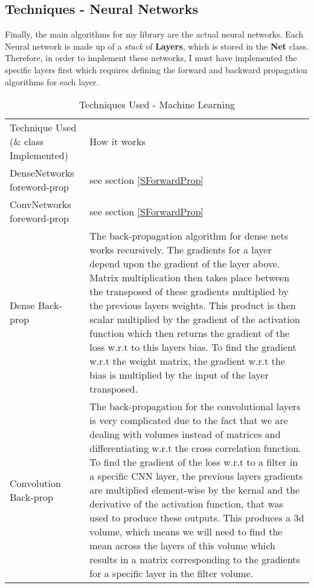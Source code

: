\subsection{Techniques - Neural Networks}
Finally, the main algorithms for my library are the actual neural networks. Each Neural network is made up of a \textit{stack} of \textbf{Layers}, which is stored in the \textbf{Net} class. Therefore, in order to implement these networks, I must have implemented the specific layers first which requires defining the forward and backward propagation algorithms for each layer.

\begin{table}[H]
\centering
    \begin{tabular}{|p{4cm}|p{11cm}|}
    \hline
    Technique Used (\& class Implemented) & How it works \\ \cline{1-2}
    
    DenseNetworks foreword-prop & see section \ref{SForwardProp} \\ \cline{1-2}
    
    ConvNetworks foreword-prop & see section \ref{SForwardProp} \\ \cline{1-2}
    
    Dense Back-prop & The back-propagation algorithm for dense nets works recursively. The gradients for a layer depend upon the gradient of the layer above. Matrix multiplication then takes place between the transposed of these gradients multiplied by the previous layers weights. This product is then scalar multiplied by the gradient of the activation function which then returns the gradient of the loss w.r.t to this layers bias. To find the gradient w.r.t the weight matrix, the gradient w.r.t the bias is multiplied by the input of the layer transposed.  \\ \cline{1-2}
    
    Convolution Back-prop & The back-propagation for the convolutional layers is very complicated due to the fact that we are dealing with volumes instead of matrices and differentiating w.r.t the cross correlation function. To find the gradient of the loss w.r.t to a filter in a specific CNN layer, the previous layers gradients are multiplied element-wise by the kernal and the derivative of the activation function, that was used to produce these outputs. This produces a 3d volume, which means we will need to find the mean across the layers of this volume which results in a matrix corresponding to the gradients for a specific layer in the filter volume. \\ \cline{1-2}
    \end{tabular}
    \caption{Techniques Used - Machine Learning}
\end{table}

